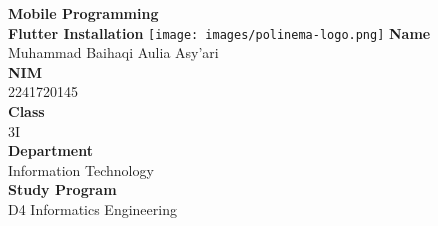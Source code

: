 \documentclass[12pt,titlepage]{article}
\newcommand{\vSubject}{Mobile Programming}
\newcommand{\vSubtitle}{Flutter Installation}
\newcommand{\vName}{Muhammad Baihaqi Aulia Asy'ari}
\newcommand{\vNIM}{2241720145}
\newcommand{\vClass}{3I}
\newcommand{\vDepartment}{Information Technology}
\newcommand{\vStudyProgram}{D4 Informatics Engineering}
\begin{document}
\begin{titlepage}
    \centering
    \vfill
    {\bfseries\LARGE
        \vSubject\\
        \vskip0.25cm
        \vSubtitle
    }
    \vfill
    \texttt{[image: images/polinema-logo.png]}
    \vfill
    {
        \textbf{Name}\\
        \vName\\
        \vskip0.5cm
        \textbf{NIM}\\
        \vNIM\\
        \vskip0.5cm
        \textbf{Class}\\
        \vClass\\
        \vskip0.5cm
        \textbf{Department}\\
        \vDepartment\\
        \vskip0.5cm
        \textbf{Study Program}\\
        \vStudyProgram
    }
\end{titlepage}

\newpage
\end{document}
